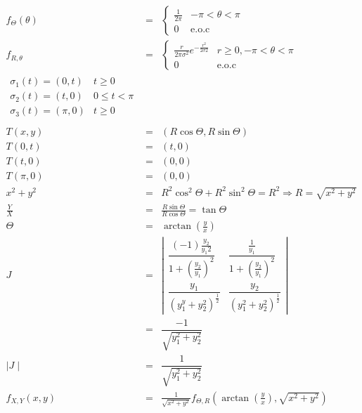 \begin{enumerate}
\begin{enumerate}
\begin{eqnarray*} 
f_{\Theta } \left( \theta \right) &=&
\begin{cases}
\frac{1}{2\pi} & -\pi < \theta < \pi\\
0 & \textrm{e.o.c}
\end{cases}\\
f_{R,\theta} &=& 
\begin{cases}
\frac{r}{2\pi \sigma^2}e^{-\frac{r^2}{2\sigma 2} } & r \geq 0 , -\pi < \theta < \pi\\
0 & \textrm{e.o.c}
\end{cases}\\
\begin{array}{cc}
\sigma_{1} \left( t \right)= \left(0,t \right) & t\geq 0\\
\sigma_{2} \left( t \right)= \left(t,0 \right) & 0\leq t < \pi\\
\sigma_{3} \left( t \right)= \left(\pi,0 \right) & t\geq 0\\
\end{array}\\
T \left(x,y \right)&=& \left( R \cos \Theta , R \sin \Theta \right)\\
T \left( 0,t \right)&=& \left( t,0 \right)\\
T \left( t, 0 \right)&=& \left( 0,0 \right)\\
T \left( \pi,0 \right)&=& \left( 0,0 \right)\\
x^2 + y^2 &=& R^2 \cos^2 \Theta + R^2 \sin^{2} \Theta = R^2
 \Rightarrow R= \sqrt{x^2 + y^2}\\
 \frac{Y}{X} &=& \frac{R \sin \Theta }{R \cos \Theta } =  \tan  \Theta\\
 \Theta &=& \arctan \left( \frac{y}{x} \right) \\
 J&=& \left|
 \begin{array}{cc}
 \dfrac{\left( -1 \right) \frac{y_{2}}{y_{1} 2} }{1 + \left( \frac{y_{2}}{y_{1}} \right)^2 } & \dfrac{\frac{1}{y_{1}} }{1 +\left( \frac{y_{2}}{y_{1}} \right)^{2} } \\
 \dfrac{y_{1}}{\left( y_{1}^{y}+ y_{2}^{2} \right)^{ \frac{1}{2} } } & \dfrac{y_{2}}{\left( y_{1}^2 + y_{2}^{2} \right)^{ \frac{1}{2} } }
 \end{array} 
  \right|\\
  &=& \dfrac{-1}{\sqrt{y_{1}^2 + y_{2}^2}}\\
  \mid J  \mid &=&  \dfrac{1}{\sqrt{y_{1}^2 + y_{2}^2}}\\
  f_{X,Y} \left( x,y \right)&=& \frac{1}{\sqrt{ x^2 + y^2}} f_{\Theta, R } \left( \arctan \left(\frac{y}{x} \right) , \sqrt{ x^2 + y^2} \right)\\

\end{eqnarray*}
\end{enumerate}
\end{enumerate}
